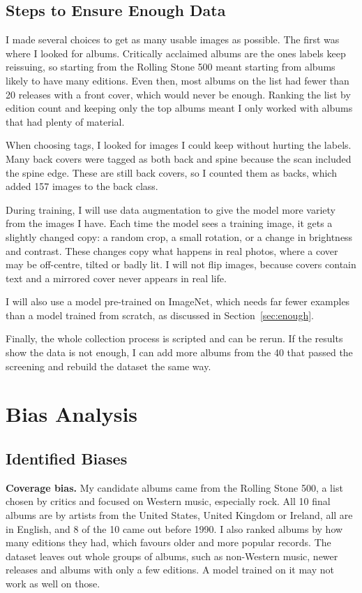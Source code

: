 \documentclass[11pt,a4paper]{article}
\begin{document}
\subsection{Steps to Ensure Enough Data}
I made several choices to get as many usable images as possible. The first was where I looked for albums. Critically acclaimed albums are the ones labels keep reissuing, so starting from the Rolling Stone 500 meant starting from albums likely to have many editions. Even then, most albums on the list had fewer than 20 releases with a front cover, which would never be enough. Ranking the list by edition count and keeping only the top albums meant I only worked with albums that had plenty of material.

When choosing tags, I looked for images I could keep without hurting the labels. Many back covers were tagged as both back and spine because the scan included the spine edge. These are still back covers, so I counted them as backs, which added 157 images to the back class.

During training, I will use data augmentation to give the model more variety from the images I have. Each time the model sees a training image, it gets a slightly changed copy: a random crop, a small rotation, or a change in brightness and contrast. These changes copy what happens in real photos, where a cover may be off-centre, tilted or badly lit. I will not flip images, because covers contain text and a mirrored cover never appears in real life.

I will also use a model pre-trained on ImageNet, which needs far fewer examples than a model trained from scratch, as discussed in Section~\ref{sec:enough}.

Finally, the whole collection process is scripted and can be rerun. If the results show the data is not enough, I can add more albums from the 40 that passed the screening and rebuild the dataset the same way.

\section{Bias Analysis}

\subsection{Identified Biases}
\textbf{Coverage bias.} My candidate albums came from the Rolling Stone 500, a list chosen by critics and focused on Western music, especially rock. All 10 final albums are by artists from the United States, United Kingdom or Ireland, all are in English, and 8 of the 10 came out before 1990. I also ranked albums by how many editions they had, which favours older and more popular records. The dataset leaves out whole groups of albums, such as non-Western music, newer releases and albums with only a few editions. A model trained on it may not work as well on those.
\end{document}
